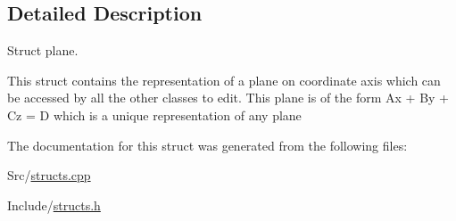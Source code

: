\subsection{Detailed Description}
Struct plane. 

This struct contains the representation of a plane on coordinate axis which can be accessed by all the other classes to edit. This plane is of the form Ax + By + Cz = D which is a unique representation of any plane 

The documentation for this struct was generated from the following files\+:\begin{DoxyCompactItemize}
\item 
Src/\hyperlink{structs_8cpp}{structs.\+cpp}\item 
Include/\hyperlink{structs_8h}{structs.\+h}\end{DoxyCompactItemize}
